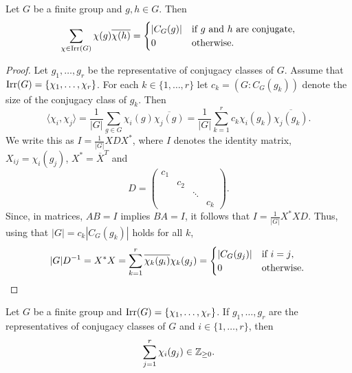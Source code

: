 \begin{theorem}[Schur]
    Let $G$ be a finite group and $g,h\in G$. 
    Then
    \[
    \sum_{\chi\in\operatorname{Irr}(G)}\chi(g)\overline{\chi(h)}
    =\begin{cases}
    |C_G(g)| & \text{if $g$ and $h$ are conjugate},\\
    0 & \text{otherwise}.
    \end{cases}
    \]
\end{theorem}

\begin{proof}
    Let $g_1,\dots,g_r$ be the representative of conjugacy classes of $G$. 
    Assume that $\operatorname{Irr}(G)=\{\chi_1,\dots,\chi_r\}$. For each $k\in\{1,\dots,r\}$ 
    let $c_k=(G:C_G(g_k))$ denote the size of the conjugacy class of $g_k$. Then
    \[
    \langle\chi_i,\chi_j\rangle
    =\frac{1}{|G|}\sum_{g\in G}\chi_i(g)\overline{\chi_j(g)}
    =\frac{1}{|G|}\sum_{k=1}^rc_k\chi_i(g_k)\overline{\chi_j(g_k)}.
    \]
    We write this as $I=\frac{1}{|G|}XDX^*$, where $I$ denotes the identity matrix, 
    $X_{ij}=\chi_i(g_j)$, 
    $X^*=\overline{X}^T$ and 
    \[
    D=\begin{pmatrix}
    c_1\\
    &c_2\\
    &&\ddots\\
    &&&c_k
    \end{pmatrix}.
    \]
    Since, in matrices, $AB=I$ implies $BA=I$, it follows that
    $I=\frac{1}{|G|}X^*XD$. Thus, using that $|G|=c_k|C_G(g_k)|$ 
    holds for all $k$, 
    \[
    |G|D^{-1}=X^*X=\sum_{k=1}^r\overline{\chi_k(g_i)}\chi_k(g_j)
    =\begin{cases}
    |C_G(g_j)| & \text{if $i=j$},\\
    0 & \text{otherwise}.
    \end{cases}\qedhere
    \]
\end{proof}

\begin{theorem}[Solomon]
    Let $G$ be a finite group and $\operatorname{Irr}(G)=\{\chi_1,\dots,\chi_r\}$. 
    If $g_1,\dots,g_r$ are the representatives of conjugacy classes
    of $G$ and $i\in\{1,\dots,r\}$, then 
    \[
    \sum_{j=1}^r\chi_i(g_j)\in\mathbb{Z}_{\geq0}.
    \]
\end{theorem}

